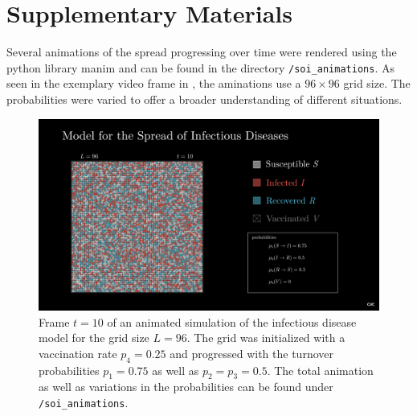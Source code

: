 \section{Supplementary Materials}


Several animations of the spread progressing over time were rendered using the python library manim\cite{pypi_manim} and can be found in the directory \texttt{/soi\_animations}. 
As seen in the exemplary video frame in , the aminations use a $96\times 96$ grid size. The probabilities were varied to offer a broader understanding of different situations.

\begin{figure}[H]
    \centering
    \includegraphics[width=1\textwidth]{images/soi_main_scene_75_50_50_25_t10.png}
    \caption{Frame $t=10$ of an animated simulation of the infectious disease model for the grid size $L=96$. The grid was initialized with a vaccination rate $p_4=0.25$ and progressed with 
    the turnover probabilities $p_1=0.75$ as well as $p_2=p_3=0.5$. The total animation as well as variations in the probabilities can be found under \texttt{/soi\_animations}.}\label{fig:apx_animation_inf_t}
\end{figure}